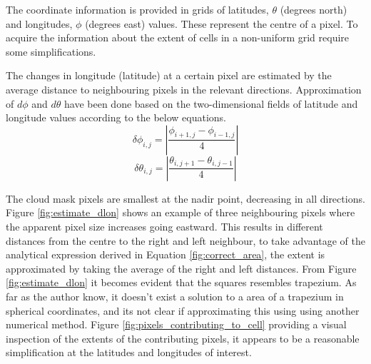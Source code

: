 The coordinate information is provided in grids of latitudes, $\theta$ (degrees north) and longitudes, $\phi$ (degrees east) values. These represent the centre of a pixel. To acquire the information about the extent of cells in a non-uniform grid require some simplifications. 

The changes in longitude (latitude) at a certain pixel are estimated by the average distance to neighbouring pixels in the relevant directions. Approximation of $d\phi$ and $d\theta$ have been done based on the two-dimensional fields of latitude and longitude values according to the below equations.%
\begin{equation} \label{eq:app_lon}
    \delta \phi_{i,j} = \left| \frac{\phi_{i+1,j} - \phi_{i-1, j}}{4} \right|
\end{equation}
\begin{equation} \label{eq:app_lat}
    \delta \theta_{i,j} = \left| \frac{\theta_{i,j+1} - \theta_{i, j-1}}{4} \right|
\end{equation}


The cloud mask pixels are smallest at the nadir point, decreasing in all directions.
Figure \ref{fig:estimate_dlon} shows an example of three neighbouring pixels where the apparent pixel size increases going eastward. This results in different distances from the centre to the right and left neighbour, to take advantage of the analytical expression derived in Equation \ref{fig:correct_area}, the extent is approximated by taking the average of the right and left distances. From Figure \ref{fig:estimate_dlon} it becomes evident that the squares resembles trapezium. As far as the author know, it doesn't exist a solution to a area of a trapezium in spherical coordinates, and its not clear if approximating this using using another numerical method. Figure \ref{fig:pixels_contributing_to_cell} providing a visual inspection of the extents of the contributing pixels, it appears to be a reasonable simplification at the latitudes and longitudes of interest. 

